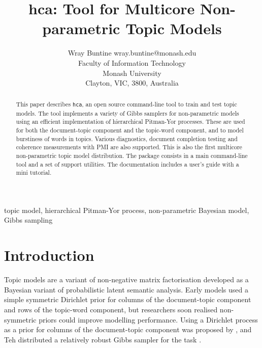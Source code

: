 \documentclass[twoside,11pt]{article}
\begin{document}
\title{hca: Tool for Multicore Non-parametric Topic Models}

\author{\name Wray Buntine \email wray.buntine@monash.edu \\
       \addr Faculty of Information Technology \\
       Monash University\\
       Clayton, VIC, 3800, Australia}


\maketitle

\begin{abstract}%
This paper describes {\tt hca}, an open source command-line tool to
train and test topic models.  The tool implements a variety of Gibbs
samplers for non-parametric models using an efficient implementation
of hierarchical Pitman-Yor processes.  These are used for both the
document-topic component and the topic-word component, and to model
burstiness of words in topics.  Various diagnostics, document
completion testing and coherence measurements with PMI are also
supported.  This is also the first multicore non-parametric topic
model distribution.  The package consists in a main command-line tool
and a set of support utilities. The documentation includes a user's
guide with a mini tutorial.
\end{abstract}

\begin{keywords}
  topic model, hierarchical Pitman-Yor process, non-parametric Bayesian model,
  Gibbs sampling
\end{keywords}

\section{Introduction}
Topic models are a variant of non-negative matrix factorisation developed
as a Bayesian variant of probabilistic latent semantic analysis.  Early models
used a simple symmetric Dirichlet prior for columns of the
document-topic component and rows of the topic-word component, but
researchers soon realised non-symmetric priors could
improve modelling performance.  Using a Dirichlet process as a prior
for columns of the document-topic component was proposed by
\cite{TehJorBea2006}, and Teh distributed a relatively robust Gibbs
sampler for the task \cite{TehNBMM21}.
\end{document}
